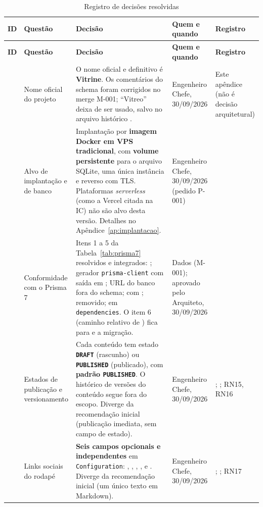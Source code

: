 \begin{longtable}{@{}L{1.1cm}L{3.2cm}L{5.5cm}L{2.5cm}L{2.0cm}@{}}
\caption{Registro de decisões resolvidas}\label{tab:decisoes-resolvidas}\\
\toprule
\textbf{ID} & \textbf{Questão} & \textbf{Decisão} & \textbf{Quem e quando} & \textbf{Registro}\\
\midrule
\endfirsthead
\toprule
\textbf{ID} & \textbf{Questão} & \textbf{Decisão} & \textbf{Quem e quando} & \textbf{Registro}\\
\midrule
\endhead
\bottomrule
\endfoot
{} & Nome oficial do projeto & O nome oficial e definitivo é \textbf{Vitrine}. Os comentários do schema foram corrigidos no merge M-001; ``Vitreo'' deixa de ser usado, salvo no arquivo histórico . & Engenheiro Chefe, 30/09/2026 & Este apêndice (não é decisão arquitetural)\\[1pt]
 & Alvo de implantação e  de banco & Implantação por \textbf{imagem Docker em VPS tradicional}, com \textbf{volume persistente} para o arquivo SQLite, uma única instância e  reverso com TLS. Plataformas \emph{serverless} (como a Vercel citada na IC) não são alvo desta versão. Detalhes no Apêndice~\ref{ap:implantacao}. & Engenheiro Chefe, 30/09/2026 (pedido P-001) & \\[1pt]
 & Conformidade com o Prisma 7 & Itens 1 a 5 da Tabela~\ref{tab:prisma7} resolvidos e integrados: ; gerador \texttt{prisma-client} com saída em ; URL do banco fora do schema;   com ;  removido;  em \texttt{dependencies}. O item 6 (caminho relativo de ) fica para  e a migração. & Dados (M-001); aprovado pelo Arquiteto, 30/09/2026 & \\[1pt]
 & Estados de publicação e versionamento & Cada conteúdo tem estado \textbf{\texttt{DRAFT}} (rascunho) ou \textbf{\texttt{PUBLISHED}} (publicado), com \textbf{padrão \texttt{PUBLISHED}}. O histórico de versões do conteúdo segue fora do escopo. Diverge da recomendação inicial (publicação imediata, sem campo de estado). & Engenheiro Chefe, 30/09/2026 & ; ; RN15, RN16\\[1pt]
 & Links sociais do rodapé & \textbf{Seis campos opcionais e independentes} em \texttt{Configuration}: , , , ,  e . Diverge da recomendação inicial (um único texto em Markdown). & Engenheiro Chefe, 30/09/2026 & ; ; RN17\\[1pt]
\end{longtable}
